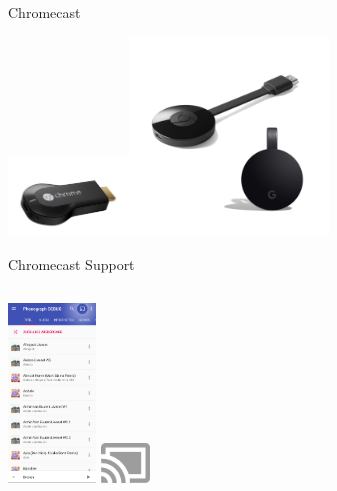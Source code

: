 \documentclass[final, english, xcolor=pdftex, dvipsnames, handout, table, aspectratio=169, 14pt]{beamer}
\begin{document}
\begin{frame}[c]{Chromecast}

\centering\includegraphics[height=80px]{pictures/chrome-cast-old-image.png}\includegraphics[height=200px]{pictures/chrome-cast-image.png}

\end{frame}

\begin{frame}{Chromecast Support}
\begin{block}{}
\begin{columns}[onlytextwidth,c]
\centering\includegraphics[height=180px]{pictures/Cast-Icon.png}
\centering\huge\faArrowRight
{}
\centering\includegraphics[height=40px]{pictures/chrome-cast.png}
\end{columns}
\end{block} 

\end{frame}
\end{document}
